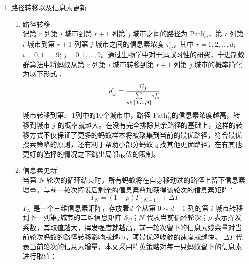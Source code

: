 \documentclass[../main.tex]{subfiles}
\begin{document}
\begin{enumerate}
	\smallskip
	\item 路径转移以及信息素更新
	\begin{enumerate}
		\item 路径转移\\
		记第 \(r\) 列第 \(i\) 城市到第 \(r+ 1\) 列第 \(j\) 城市之间的路径为 \(\mathrm{Path} _{ij} ^{r}\)，第 \(r\) 列第 \(i\) 城市到第 \(r+ 1\) 列第 \(j\) 城市之间的信息素浓度 \(\tau ^{r} _{ij}\)，其中 \(r = 1, 2, \dots , d\); \(i = 0, 1 , \dots , 9\); \(j = 0 , 1 , \dots , 9\)。通过生物学中对于蚂蚁习性的研究，十进制蚁群算法中将蚂蚁从第 \(r\) 列第 \(i\) 城市转移到第 \(r+1\) 列第 \(j\) 城市的概率简化为以下形式：
		\begin{equation}\label{equ:pass1}
		\rho _{ij} ^{r} = \frac{\tau ^{r} _{ij}}{\sum\limits_{s\in \{0 , \dots , 9\}} \kern -2pt\tau ^{r} _{is}}
		\end{equation}
		城市转移到第r+1列中的10个城市中，路径 \(\mathrm{Path}_{ij} ^{r}\)的信息素浓度越高，转移到城市 \(j\) 的概率就越大。在没有完全排除其余路径的基础上，这样的转移方式不仅保证了更多的蚂蚁样本将被聚集到当前的最优路径，符合最优搜索策略的原则，还有利于帮助小部分蚂蚁寻找其他更优路径，在有其他更好的选择的情况之下跳出局部最优的限制。
		\smallskip
		\item 信息素更新\\
		当第 \(N\) 轮次的循环结束时，所有蚂蚁将在自身移动过的路径上留下信息素增量，与前一轮次挥发后剩余的信息素叠加获得该轮次的信息素矩阵：
		\begin{equation}\label{equ:shit}
		T_{N} = (1 - \rho) T _{(N- 1)} + \Delta T
		\end{equation}
		\(T_{N}\) 是一个三维信息素矩阵，存放着\(d\) 个从第 \(0\sim d -1\) 列的第 \(i\) 城市转移到下一列第\(j\)城市的二维信息矩阵 \(S_{ij}\)；\(N\) 代表当前循环轮次；\(\rho\) 表示挥发系数，其取值越大，挥发强度就越高，前一轮次留下的信息素残余量对当前轮次蚂蚁的路径转移影响就越小，项最优解收敛的速度就越快。
		\(\Delta T\) 代表当前轮次的信息素增量，本文采用精英策略对每一只蚂蚁留下的信息素进行取值：


\end{enumerate}
\end{enumerate}
\end{document}
